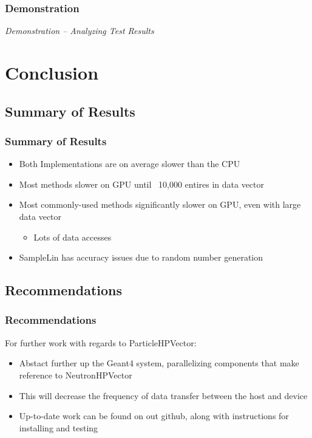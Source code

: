 \documentclass{beamer}
\begin{document}
\begin{frame}
\frametitle{Demonstration}
\begin{center}
\emph{Demonstration -- Analyzing Test Results}
\end{center}
\end{frame}

\section{Conclusion}
\subsection{Summary of Results}
\begin{frame}
\frametitle{Summary of Results}
\begin{itemize}
\item Both Implementations are on average slower than the CPU
\item Most methods slower on GPU until ~10,000 entires in data vector
\item Most commonly-used methods significantly slower on GPU, even with large data vector
\begin{itemize}
\item Lots of data accesses
\end{itemize}
\item SampleLin has accuracy issues due to random number generation
\end{itemize}
\end{frame}

\subsection{Recommendations}
\begin{frame}
\frametitle{Recommendations}
For further work with regards to ParticleHPVector:
\begin{itemize}
\item Abstact further up the Geant4 system, parallelizing 
components that make reference to NeutronHPVector
\item This will decrease the frequency of data transfer 
between the host and device
\item Up-to-date work can be found on out github, along 
with instructions for installing and testing
\end{itemize}
\end{frame}
\end{document}
